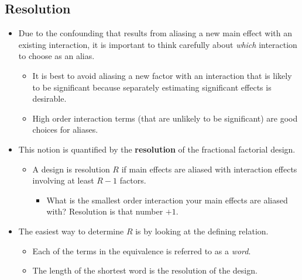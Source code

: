 \subsection{Resolution}
\begin{itemize}[*]
    \item Due to the confounding that results from aliasing a new main effect with an existing interaction, it is
          important to think carefully about \emph{which} interaction to choose as an alias.
          \begin{itemize}[*]
              \item It is best to avoid aliasing a new factor with an interaction that is likely to be significant because
                    separately estimating significant effects is desirable.
          \end{itemize}
          \begin{itemize}
              \item High order interaction terms (that are unlikely to be significant) are good choices for aliases.
          \end{itemize}
    \item This notion is quantified by the \textbf{resolution} of the fractional factorial design.
          \begin{itemize}[$\rightarrow$]
              \item A design is resolution $R$ if main effects are aliased with interaction effects involving at least $R - 1$ factors.
                    \begin{itemize}[label={}]
                        \item What is the smallest order interaction your main effects are aliased with? Resolution is that number $ +1 $.
                    \end{itemize}
          \end{itemize}
    \item The easiest way to determine $R$ is by looking at the defining relation.
          \begin{itemize}
              \item Each of the terms in the equivalence is referred to as a \emph{word}.
          \end{itemize}
          \begin{itemize}[$\rightarrow$]
              \item The length of the shortest word is the resolution of the design.
          \end{itemize}

\end{itemize}
